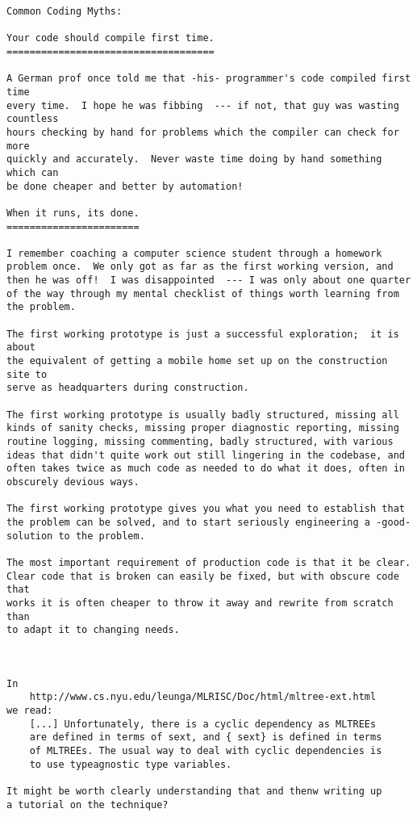 \begin{verbatim}
Common Coding Myths: 

Your code should compile first time. 
==================================== 

A German prof once told me that -his- programmer's code compiled first time 
every time.  I hope he was fibbing  --- if not, that guy was wasting countless 
hours checking by hand for problems which the compiler can check for more 
quickly and accurately.  Never waste time doing by hand something which can 
be done cheaper and better by automation! 

When it runs, its done. 
======================= 

I remember coaching a computer science student through a homework 
problem once.  We only got as far as the first working version, and 
then he was off!  I was disappointed  --- I was only about one quarter 
of the way through my mental checklist of things worth learning from 
the problem. 

The first working prototype is just a successful exploration;  it is about 
the equivalent of getting a mobile home set up on the construction site to 
serve as headquarters during construction. 

The first working prototype is usually badly structured, missing all 
kinds of sanity checks, missing proper diagnostic reporting, missing 
routine logging, missing commenting, badly structured, with various 
ideas that didn't quite work out still lingering in the codebase, and 
often takes twice as much code as needed to do what it does, often in 
obscurely devious ways. 

The first working prototype gives you what you need to establish that 
the problem can be solved, and to start seriously engineering a -good- 
solution to the problem. 

The most important requirement of production code is that it be clear. 
Clear code that is broken can easily be fixed, but with obscure code that 
works it is often cheaper to throw it away and rewrite from scratch than 
to adapt it to changing needs. 



In 
    http://www.cs.nyu.edu/leunga/MLRISC/Doc/html/mltree-ext.html 
we read: 
    [...] Unfortunately, there is a cyclic dependency as MLTREEs 
    are defined in terms of sext, and { sext} is defined in terms 
    of MLTREEs. The usual way to deal with cyclic dependencies is 
    to use typeagnostic type variables. 

It might be worth clearly understanding that and thenw writing up 
a tutorial on the technique? 




\end{verbatim}
